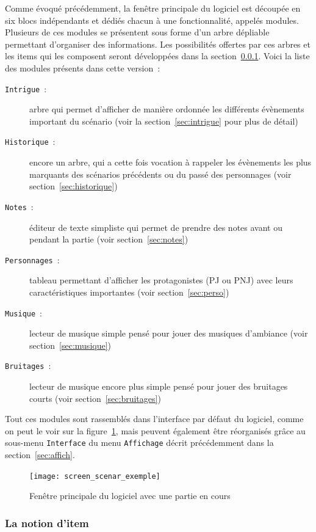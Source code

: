 \documentclass[a4paper,12pt]{article}
\newcommand*{\interfaceitem}[1]{\texttt{#1}}
\newcommand*{\guillemets}[1]{\og #1\fg{}\xspace}
\begin{document}
Comme évoqué précédemment, la fenêtre principale du logiciel est découpée en six blocs indépendants et dédiés chacun à une fonctionnalité, appelés modules.
Plusieurs de ces modules se présentent sous forme d'un arbre \guillemets{dépliable} permettant d'organiser des informations.
Les possibilités offertes par ces arbres et les items qui les composent seront développées dans la section~\ref{item}.
Voici la liste des modules présents dans cette version~:
\begin{description}
    \item[\interfaceitem{Intrigue}~:]{arbre qui permet d'afficher de manière ordonnée les différents évènements important du scénario (voir la section~\ref{sec:intrigue} pour plus de détail)}
    \item[\interfaceitem{Historique}~:]{encore un arbre, qui a cette fois vocation à rappeler les évènements les plus marquants des scénarios précédents ou du passé des personnages (voir section~\ref{sec:historique})}
    \item[\interfaceitem{Notes}~:]{éditeur de texte simpliste qui permet de prendre des notes avant ou pendant la partie (voir section~\ref{sec:notes})}
    \item[\interfaceitem{Personnages}~:]{tableau permettant d'afficher les protagonistes (PJ ou PNJ) avec leurs caractéristiques importantes (voir section~\ref{sec:perso})}
    \item[\interfaceitem{Musique}~:]{lecteur de musique simple pensé pour jouer des musiques d'ambiance (voir section~\ref{sec:musique})}
    \item[\interfaceitem{Bruitages}~:]{lecteur de musique encore plus simple pensé pour jouer des bruitages courts (voir section~\ref{sec:bruitages})}
\end{description}
Tout ces modules sont rassemblés dans l'interface par défaut du logiciel, comme on peut le voir sur la figure~\ref{fig:interface}, mais peuvent également être réorganisés grâce au sous-menu \interfaceitem{Interface} du menu \interfaceitem{Affichage} décrit précédemment dans la section~\ref{sec:affich}.
\begin{figure}[h]
    \texttt{[image: screen\_scenar\_exemple]}
    \caption{Fenêtre principale du logiciel avec une partie en cours}
    \label{fig:interface}
\end{figure}

\subsubsection{La notion d'item}
\label{item}
\end{document}
